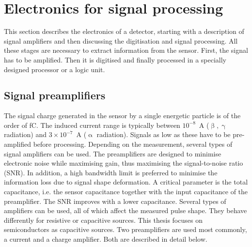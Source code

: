 \section{Electronics for signal processing} %
\label{sec:elecsigproc}
This section describes the electronics of a detector, starting with a description of signal amplifiers and then discussing the digitisation and signal processing. All these stages are necessary to extract information from the sensor. First, the signal has to be amplified. Then it is digitised and finally processed in a specially designed processor or a logic unit.

\subsection{Signal preamplifiers}
The signal charge generated in the sensor by a single energetic particle is of the order of fC. The induced current range is typically between $10^{-8}$~A ($\upbeta, \upgamma$ radiation) and $3\times10^{-7}$~A ($\upalpha$ radiation). Signals as low as these have to be pre-amplified before processing. Depending on the measurement, several types of signal amplifiers can be used. The preamplifiers are designed to minimise electronic noise while maximising gain, thus maximising the signal-to-noise ratio (SNR). In addition, a high bandwidth limit is preferred to minimise the information loss due to signal shape deformation. A critical parameter is the total capacitance, i.e. the sensor capacitance together with the input capacitance of the preamplifier. The SNR improves with a lower capacitance. Several types of amplifiers can be used, all of which affect the measured pulse shape. They behave differently for resistive or capacitive sources. This thesis focuses on semiconductors as capacitive sources. Two preamplifiers are used most commonly, a current and a charge amplifier. Both are described in detail below. 

